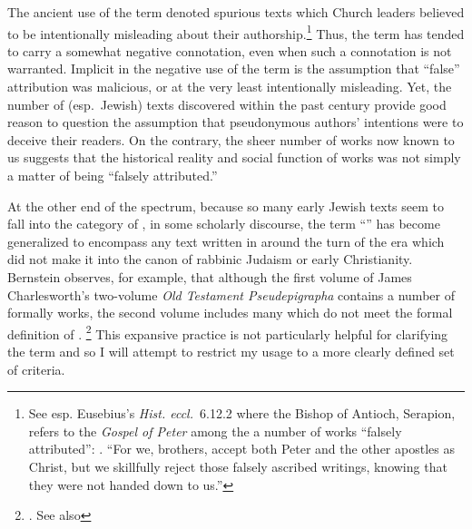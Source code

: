 The ancient use of the term \psa denoted spurious texts which Church leaders believed to be intentionally misleading about their authorship.\footnote{See esp. Eusebius's \emph{Hist. eccl.}~6.12.2 where the Bishop of Antioch, Serapion, refers to the \emph{Gospel of Peter} among the a number of works ``falsely attributed'': . ``For we, brothers, accept both Peter and the other apostles as Christ, but we skillfully reject those falsely ascribed writings, knowing that they were not handed down to us.''} Thus, the term has tended to carry a somewhat negative connotation, even when such a connotation is not warranted. Implicit in the negative use of the term is the assumption that ``false'' attribution was malicious, or at the very least intentionally misleading. Yet, the number of (esp.~Jewish) \psgraphical texts discovered within the past century provide good reason to question the assumption that pseudonymous authors' intentions were to deceive their readers.\autocites[53--58]{mroczek2016}[See also][]{reed_jts2009} On the contrary, the sheer number of \psgraphical works now known to us suggests that the historical reality and social function of \psgraphical works was not simply a matter of being ``falsely attributed.''

At the other end of the spectrum, because so many early Jewish texts seem to fall into the category of \psa, in some scholarly discourse, the term ``\psa'' has become generalized to encompass any text written in around the turn of the era which did not make it into the canon of rabbinic Judaism or early Christianity. Bernstein observes, for example, that although the first volume of James Charlesworth's two-volume \emph{Old Testament Pseudepigrapha} contains a number of formally \psgraphic works, the second volume includes many which do not meet the formal definition of \psa.%
%
\footnote{\cite[2]{bernstein_chazon-etal1999}. See also }
%
This expansive practice is not particularly helpful for clarifying the term and so I will attempt to restrict my usage to a more clearly defined set of criteria.

